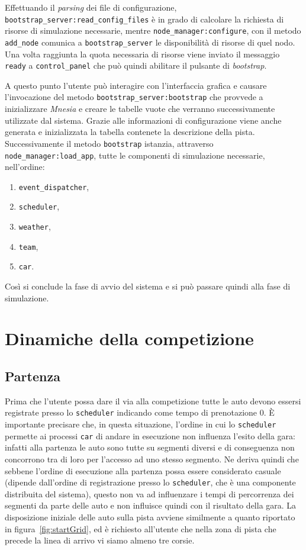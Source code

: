 \documentclass[a4paper]{report}
\newcommand{\fun}[1]{\texttt{#1}}
\begin{document}
Effettuando il \textit{parsing} dei file di configurazione, \fun{bootstrap\_server:read\_config\_files} è in grado di calcolare la richiesta di risorse di simulazione necessarie, mentre \fun{node\_manager:configure}, con il metodo \fun{add\_node} comunica a \texttt{bootstrap\_server} le disponibilità di risorse di quel nodo. Una volta raggiunta la quota necessaria di risorse viene inviato il messaggio \fun{ready} a \texttt{control\_panel} che può quindi abilitare il pulsante di \textit{bootstrap}.

A questo punto l'utente può interagire con l'interfaccia grafica e causare l'invocazione del metodo \fun{bootstrap\_server:bootstrap} che provvede a inizializzare \textsl{Mnesia} e creare le tabelle vuote che verranno successivamente utilizzate dal sistema. Grazie alle informazioni di configurazione viene anche generata e inizializzata la tabella contenete la descrizione della pista. Successivamente il metodo \fun{bootstrap} istanzia, attraverso \fun{node\_manager:load\_app}, tutte le componenti di simulazione necessarie, nell'ordine:
\begin{enumerate}
\item \texttt{event\_dispatcher},
\item \texttt{scheduler},
\item \texttt{weather},
\item \texttt{team},
\item \texttt{car}.
\end{enumerate}

Così si conclude la fase di avvio del sistema e si può passare quindi alla fase di simulazione.

\section{Dinamiche della competizione}
\subsection{Partenza}
Prima che l'utente possa dare il via alla competizione tutte le auto devono essersi registrate presso lo \texttt{scheduler} indicando come tempo di prenotazione $0$. \`E importante precisare che, in questa situazione, l'ordine in cui lo \texttt{scheduler} permette ai processi \texttt{car} di andare in esecuzione non influenza l'esito della gara: infatti alla partenza le auto sono tutte su segmenti diversi e di conseguenza non concorrono tra di loro per l'accesso ad uno stesso segmento. Ne deriva quindi che sebbene l'ordine di esecuzione alla partenza possa essere considerato casuale (dipende dall'ordine di registrazione presso lo \texttt{scheduler}, che è una componente distribuita del sistema), questo non va ad influenzare i tempi di percorrenza dei segmenti da parte delle auto e non influisce quindi con il risultato della gara.
La disposizione iniziale delle auto sulla pista avviene similmente a quanto riportato in figura~\ref{fig:startGrid}, ed è richiesto all'utente che nella zona di pista che precede la linea di arrivo vi siamo almeno tre corsie.
\end{document}
